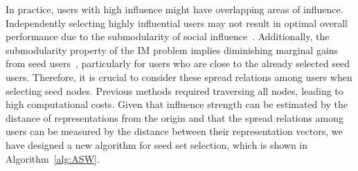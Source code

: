 In practice, users with high influence might have overlapping areas of influence. Independently selecting highly influential users may not result in optimal overall performance due to the submodularity of social influence~\cite{kempe2003im}. Additionally, the submodularity property of the IM problem implies diminishing marginal gains from seed users~\cite{TKDE18_li2018influence_survey}, particularly for users who are close to the already selected seed users. Therefore, it is crucial to consider these spread relations among users when selecting seed nodes. Previous methods required traversing all nodes, leading to high computational costs. Given that influence strength can be estimated by the distance of representations from the origin and that the spread relations among users can be measured by the distance between their representation vectors, we have designed a new algorithm for seed set selection, which is shown in Algorithm~\ref{alg:ASW}.

